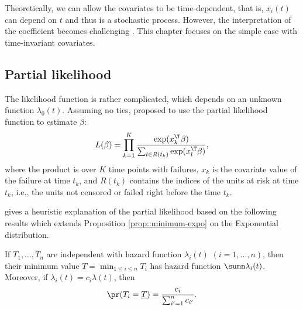 Theoretically, we can allow the covariates to be time-dependent, that is, $x_i(t)$ can depend on $t$ and thus is a stochastic process. However, the interpretation of the coefficient becomes challenging \citep{fisher1999time}. This chapter focuses on the simple case with time-invariant covariates. 




\subsection{Partial likelihood}


The likelihood function is rather complicated, which depends on an unknown function $\lambda_0(t)$. 
Assuming no ties, \citet{cox1972regression} proposed to use the partial likelihood function
to estimate $\beta$:
\[
L(\beta)=\prod_{k=1}^{K}\frac{\exp(x_{k}^{\T}\beta)}{\sum_{l\in R(t_{k})}\exp(x_{l}^{\T}\beta)},
\]
where the product is over $K$ time points with failures, $x_k$ is the covariate value of the failure at time $t_k$, and $R(t_k)$ contains the indices of the units at risk at time $t_k$, i.e., the units not censored or failed right before the time $t_k$. 


\citet{freedman2008survival} gives a heuristic explanation of the partial likelihood based on the following results which extends Proposition \ref{prop::minimum-expo} on the Exponential distribution. 

\begin{theorem}
\label{thm::freedman-explain-cox}
If $T_1,\ldots, T_n$ are independent with hazard function $\lambda_i(t)$ $(i=1,\ldots, n)$, then their minimum value $\underline{T} = \min_{1\leq i \leq n} T_i$ has hazard function $\sumn \lambda_i(t)$.
Moreover, if $\lambda_i(t) = c_i \lambda(t)$, then 
$$
\pr (  T_i = \underline{T}  ) = \frac{c_i}{ \sum_{i'=1}^n  c_{i'} }.
$$
\end{theorem} 

